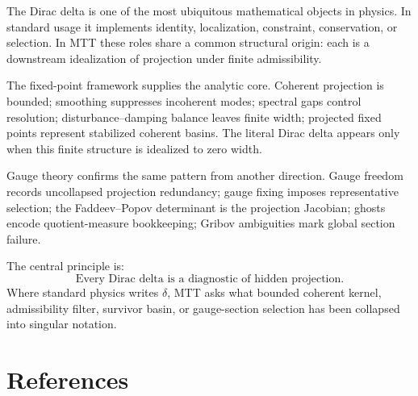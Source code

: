 \documentclass[11pt]{article}
\begin{document}
The Dirac delta is one of the most ubiquitous mathematical objects in physics.  In standard
usage it implements identity, localization, constraint, conservation, or selection.  In MTT
these roles share a common structural origin: each is a downstream idealization of projection
under finite admissibility.

The fixed-point framework supplies the analytic core.  Coherent projection is bounded;
smoothing suppresses incoherent modes; spectral gaps control resolution; disturbance--damping
balance leaves finite width; projected fixed points represent stabilized coherent basins.  The
literal Dirac delta appears only when this finite structure is idealized to zero width.

Gauge theory confirms the same pattern from another direction.  Gauge freedom records
uncollapsed projection redundancy; gauge fixing imposes representative selection; the
Faddeev--Popov determinant is the projection Jacobian; ghosts encode quotient-measure
bookkeeping; Gribov ambiguities mark global section failure.

The central principle is:
\[
\boxed{\text{Every Dirac delta is a diagnostic of hidden projection.}}
\]
Where standard physics writes \(\delta\), MTT asks what bounded coherent kernel,
admissibility filter, survivor basin, or gauge-section selection has been collapsed into
singular notation.


\section*{References}
\end{document}
